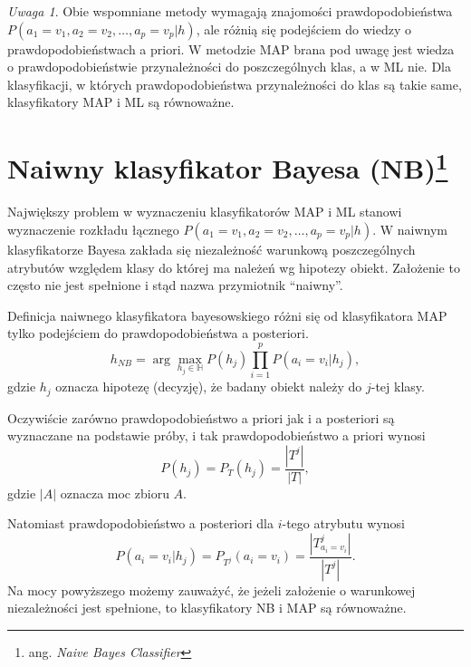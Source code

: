 \documentclass[
]{book}
\theoremstyle{plain}
\theoremstyle{definition}
\theoremstyle{definition}
\theoremstyle{definition}
\theoremstyle{definition}
\theoremstyle{definition}
\theoremstyle{remark}
\newtheorem*{remark}{Uwaga}
\begin{document}
\begin{remark}
Obie wspomniane metody wymagają znajomości prawdopodobieństwa \(P(a_1=v_1,a_2=v_2,\ldots,a_p=v_p|h)\), ale różnią się podejściem do wiedzy o prawdopodobieństwach a priori. W metodzie MAP brana pod uwagę jest wiedza o prawdopodobieństwie przynależności do poszczególnych klas, a w ML nie. Dla klasyfikacji, w których prawdopodobieństwa przynależności do klas są takie same, klasyfikatory MAP i ML są równoważne.
\end{remark}

\section[Naiwny klasyfikator Bayesa (NB)]{\texorpdfstring{Naiwny klasyfikator Bayesa (NB)\footnote{ang. \emph{Naive Bayes Classifier}}}{Naiwny klasyfikator Bayesa (NB)}}\label{naiwny-klasyfikator-bayesa-nb}

Największy problem w wyznaczeniu klasyfikatorów MAP i ML stanowi wyznaczenie rozkładu łącznego \(P(a_1=v_1, a_2=v_2,\ldots,a_p=v_p|h)\). W naiwnym klasyfikatorze Bayesa zakłada się niezależność warunkową poszczególnych atrybutów względem klasy do której ma należeń wg hipotezy obiekt. Założenie to często nie jest spełnione i stąd nazwa przymiotnik ``naiwny''.

Definicja naiwnego klasyfikatora bayesowskiego różni się od klasyfikatora MAP tylko podejściem do prawdopodobieństwa a posteriori.
\begin{equation}\label{naiwny_bayes}
        h_{NB}=\operatorname{arg}\max_{h_j\in \mathbb{H}}P(h_j)\prod_{i=1}^{p}P(a_i=v_i|h_j),
\end{equation}
gdzie \(h_j\) oznacza hipotezę (decyzję), że badany obiekt należy do \(j\)-tej klasy.

Oczywiście zarówno prawdopodobieństwo a priori jak i a posteriori są wyznaczane na podstawie próby, i tak prawdopodobieństwo a priori wynosi
\begin{equation}\label{apriori}
        P(h_j)=P_T(h_j)=\frac{|T^j|}{|T|}, 
\end{equation}
gdzie \(|A|\) oznacza moc zbioru \(A\).

Natomiast prawdopodobieństwo a posteriori dla \(i\)-tego atrybutu wynosi
\begin{equation}\label{aposteriori}
        P(a_i=v_i|h_j)=P_{T^j}(a_i=v_i)=\frac{|T^j_{a_i=v_i}|}{|T^j|}.
\end{equation}
Na mocy powyższego możemy zauważyć, że jeżeli założenie o warunkowej niezależności jest spełnione, to klasyfikatory NB i MAP są równoważne.
\end{document}
